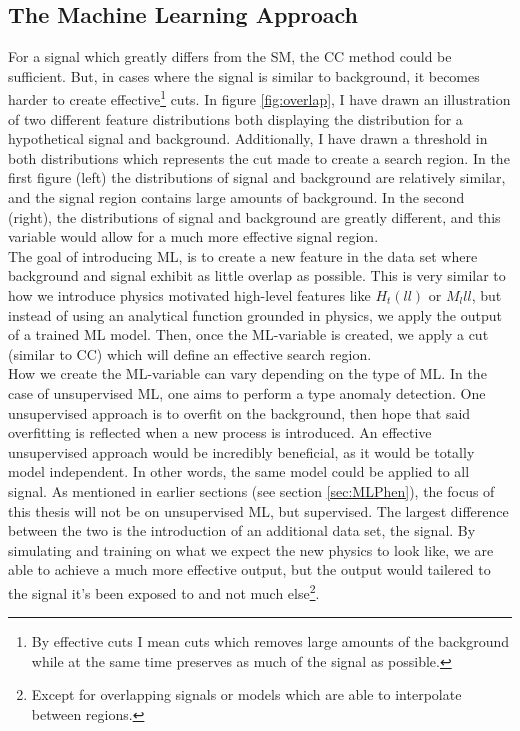 \subsection{The Machine Learning Approach}
For a signal which greatly differs from the \ac{SM}, the \ac{CC} method could be sufficient. But, in 
cases where the signal is similar to background, it becomes harder to create effective\footnote{By effective
cuts I mean cuts which removes large amounts of the background while at the same time preserves as much of 
the signal as possible.} cuts. In figure \ref{fig:overlap}, I have drawn an illustration of two different feature distributions both 
displaying the distribution for a hypothetical signal and background. Additionally, I have drawn a 
threshold in both distributions which represents the cut made to create a search region. In the first 
figure (left) the distributions of signal and background are relatively similar, and the signal region 
contains large amounts of background. In the second (right), the distributions of signal and background 
are greatly different, and this variable would allow for a much more effective signal region. 
\\
The goal of introducing \ac{ML}, is to create a new feature in the data set where background and signal
exhibit as little overlap as possible. This is very similar to how we introduce physics motivated high-level
features like $H_t(ll)$ or $M_lll$, but instead of using an analytical function grounded in physics, 
we apply the output of a trained \ac{ML} model. Then, once the \ac{ML}-variable is created, 
we apply a cut (similar to \ac{CC}) which will define an effective search region. 
\\
How we create the \ac{ML}-variable can vary depending on the type of \ac{ML}. In the case of unsupervised 
\ac{ML}, one aims to perform a type anomaly detection. One unsupervised approach is to overfit on the background,
then hope that said overfitting is reflected when a new process is introduced. An effective unsupervised approach
would be incredibly beneficial, as it would be totally model independent. In other words, the same model could be applied 
to all signal. As mentioned in earlier sections (see section \ref{sec:MLPhen}), the focus of this thesis will not be on 
unsupervised \ac{ML}, but supervised. The largest difference between the two is the introduction of an additional data set,
the signal. By simulating and training on what we expect the new physics to look like, we are able to achieve a much more 
effective output, but the output would tailered to the signal it's been exposed to and not much else\footnote{Except for 
overlapping signals or models which are able to interpolate between regions.}.